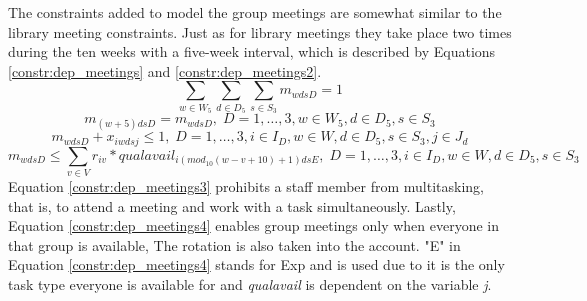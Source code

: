 The constraints added to model the group meetings are somewhat similar to the library meeting constraints. Just as for library meetings they take place two times during the ten weeks with a five-week interval, which is described by Equations \ref{constr:dep_meetings} and \ref{constr:dep_meetings2}.
\begin{equation} \label{constr:dep_meetings}
\sum_{w \in W_5}\sum_{d \in D_5}\sum_{s \in S_3} m_{wdsD} = 1
\end{equation}
\begin{equation} \label{constr:dep_meetings2}
m_{(w+5)dsD} = m_{wdsD}, \;   D = 1, \ldots, 3, w \in W_5, d \in D_5, s \in S_3
\end{equation}
\begin{equation} \label{constr:dep_meetings3}
m_{wdsD} + x_{iwdsj} \leq 1, \;   D = 1, \ldots, 3, i \in I_D, w \in W, d \in D_5, s \in S_3, j \in J_d
\end{equation}
\begin{equation} \label{constr:dep_meetings4}
m_{wdsD} \leq \sum_{v \in V} r_{iv}*qualavail_{i(mod_{10}(w-v+10)+1)dsE}, \;   D = 1, \ldots, 3, i \in I_D, w \in W, d \in D_5, s \in S_3
\end{equation}
Equation \ref{constr:dep_meetings3} prohibits a staff member from multitasking, that is, to attend a meeting and work with a task simultaneously. Lastly, Equation \ref{constr:dep_meetings4} enables group meetings only when everyone in that group is available, The rotation is also taken into the account. "E" in Equation \ref{constr:dep_meetings4} stands for Exp and is used due to it is the only task type everyone is available for and \textit{qualavail} is dependent on the variable \textit{j}. 

